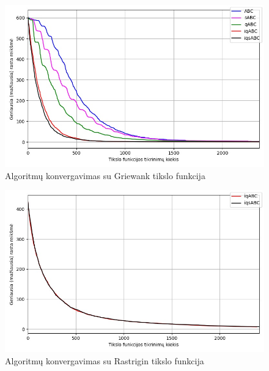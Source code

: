 \documentclass{VUMIFKompMagistrinis}
\begin{document}
\begin{landscape}
\begin{multicols}{2}
\begin{figure}[H]
    \centering
    \includegraphics[scale=0.45]{img/2kv/all_griewank.jpg}
     \caption{Algoritmų konvergavimas su Griewank tikslo funkcija}
    \label{img:vkon5a}
\end{figure}

\begin{figure}[H]
    \centering
    \includegraphics[scale=0.5]{img/2kg/rastrigin.jpg}
     \caption{Algoritmų konvergavimas su Rastrigin tikslo funkcija}
    \label{img:vkon5}
\end{figure}



\end{multicols}
\begin{multicols}{2}


\end{multicols}
\end{landscape}
\end{document}
